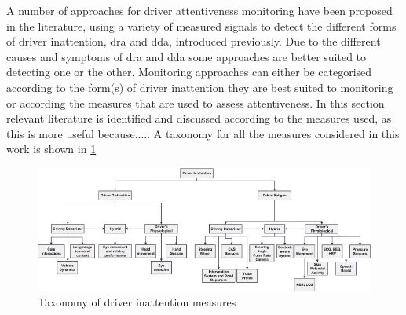 \documentclass[11pt, parskip=half*,twoside=false]{scrbook}
\begin{document}
%
A number of approaches for driver attentiveness monitoring have been proposed in the literature, using a variety of measured signals to detect the different forms of driver inattention, \gls{dra} and \gls{dda}, introduced previously. Due to the different causes and symptoms of \gls{dra} and \gls{dda} some approaches are better suited to detecting one or the other. Monitoring approaches can either be categorised according to the form(s) of driver inattention they are best suited to monitoring or according the measures that are used to assess attentiveness. In this section relevant literature is identified and discussed according to the measures used, as this is more useful because..... A taxonomy for all the measures considered in this work is shown in \cref{fig:taxonomy_measures}

\begin{figure} 
	\centering
	\includegraphics[width=\textwidth]{inattention_inputs_taxonomy} 
	\caption{Taxonomy of driver inattention measures}
	\label{fig:taxonomy_measures}
\end{figure}
\end{document}
